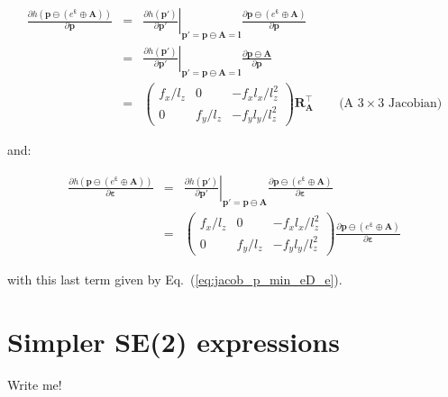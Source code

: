 \documentclass[a4paper,11pt]{report}
\newcommand{\E}{{\bm{\varepsilon}}}
\newcommand{\A}{{\mathbf{A}}}
\begin{document}
\begin{eqnarray}
\frac{\partial h(\mathbf{p} \ominus (e^\E \oplus \A) )}{\partial \mathbf{p}}
&=&
\left. \frac{\partial h(\mathbf{p'})}{\partial \mathbf{p'}} \right|_{ \mathbf{p'} = \mathbf{p} \ominus \A = \mathbf{l} }
\frac{\partial \mathbf{p} \ominus (e^\E \oplus \A) }{\partial \mathbf{p}} \\
&=&
\left. \frac{\partial h(\mathbf{p'})}{\partial \mathbf{p'}} \right|_{ \mathbf{p'} = \mathbf{p} \ominus \A = \mathbf{l} }
\frac{\partial \mathbf{p} \ominus \A }{\partial \mathbf{p}} \\
&=&
\left(
\begin{array}{ccc}
 f_x / l_z   &    0    &  -f_x l_x / l_z^2   \\
 0 & f_y / l_z  &  -f_y l_y / l_z^2
\end{array}
\right)
\mathbf{R_A^\top}
\quad\quad \text{(A $3 \times 3$ Jacobian)}
\end{eqnarray}

\noindent and:

\begin{eqnarray}
\frac{\partial h(\mathbf{p} \ominus (e^\E \oplus \A) )}{\partial \E}
&=&
\left. \frac{\partial h(\mathbf{p'})}{\partial \mathbf{p'}} \right|_{ \mathbf{p'} = \mathbf{p} \ominus \A }
\frac{\partial \mathbf{p} \ominus (e^\E \oplus \A) }{\partial \E} \\
&=&
\left(
\begin{array}{ccc}
 f_x / l_z   &    0    &  -f_x l_x / l_z^2   \\
 0 & f_y / l_z  &  -f_y l_y / l_z^2
\end{array}
\right)
\frac{\partial \mathbf{p} \ominus (e^\E \oplus \A) }{\partial \E}
\end{eqnarray}

\noindent with this last term given by Eq.~(\ref{eq:jacob_p_min_eD_e}).


\chapter{Simpler SE(2) expressions}
\label{ch:apx:se2}

Write me!




\end{document}
